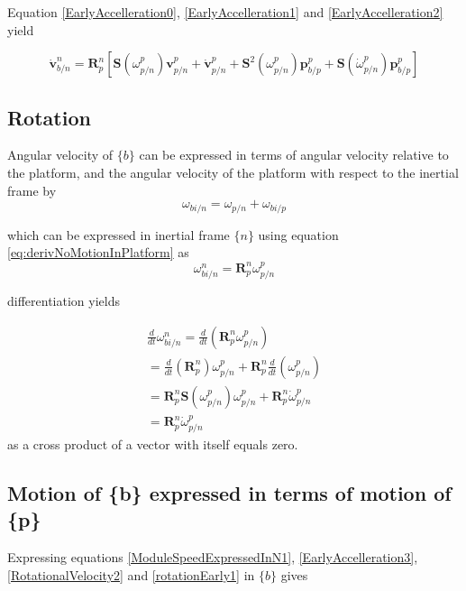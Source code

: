 Equation \ref{EarlyAccelleration0}, \ref{EarlyAccelleration1} and \ref{EarlyAccelleration2} yield

\begin{equation}
\dot{\textbf{v}}_{b/n}^{n} = \textbf{R}_{p}^{n}[\textbf{S}(\omega_{p/n}^{p}) \textbf{v}_{p/n}^{p} + \dot{\textbf{v}}_{p/n}^{p} + \textbf{S}^{2}(\omega_{p/n}^{p}) \textbf{p}_{b/p}^{p} + \textbf{S}(\dot{\omega}_{p/n}^{p})\textbf{p}_{b/p}^{p} ]
\label{EarlyAccelleration3}
\end{equation}


\subsection{Rotation}
Angular velocity of $\{b\}$ can be expressed in terms of angular velocity relative to the platform, and the angular velocity of the platform with respect to the inertial frame by 
\begin{equation}
\omega_{bi/n} = \omega_{p/n} + \omega_{bi/p}
\label{RotationalVelocity1}
\end{equation}

which can be expressed in inertial frame $\{n\}$ using equation \ref{eq:derivNoMotionInPlatform} as
\begin{equation}
\omega_{bi/n}^{n} = \textbf{R}_{p}^{n}\omega_{p/n}^{p}
\label{RotationalVelocity2}
\end{equation}


differentiation yields

\begin{equation} \begin{split}
\frac{d}{dt}\omega_{bi/n}^{n} = \frac{d}{dt}(\textbf{R}_{p}^{n}\omega_{p/n}^{p}) \\
= \frac{d}{dt}(\textbf{R}_{p}^{n}) \omega_{p/n}^{p} + \textbf{R}_{p}^{n} \frac{d}{dt}(\omega_{p/n}^{p})\\
= \textbf{R}_{p}^{n}\textbf{S}(\omega_{p/n}^{p})\omega_{p/n}^{p} + \textbf{R}_{p}^{n} \dot{\omega}_{p/n}^{p}\\
= \textbf{R}_{p}^{n} \dot{\omega}_{p/n}^{p}
\end{split}
\label{rotationEarly1}
\end{equation}
as a cross product of a vector with itself equals zero. 

\subsection{Motion of \{b\} expressed in terms of motion of \{p\}}
Expressing equations 
\ref{ModuleSpeedExpressedInN1}, \ref{EarlyAccelleration3}, \ref{RotationalVelocity2} and \ref{rotationEarly1} in $\{b\}$ gives

